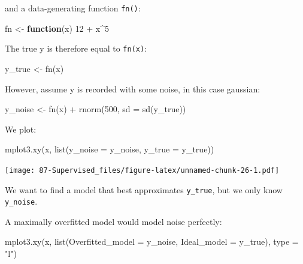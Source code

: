 \documentclass[
]{book}
\newenvironment{Shaded}{\begin{snugshade}}{\end{snugshade}}
\newcommand{\AttributeTok}[1]{\textcolor[rgb]{0.77,0.63,0.00}{#1}}
\newcommand{\ControlFlowTok}[1]{\textcolor[rgb]{0.13,0.29,0.53}{\textbf{#1}}}
\newcommand{\DecValTok}[1]{\textcolor[rgb]{0.00,0.00,0.81}{#1}}
\newcommand{\FunctionTok}[1]{\textcolor[rgb]{0.00,0.00,0.00}{#1}}
\newcommand{\NormalTok}[1]{#1}
\newcommand{\OtherTok}[1]{\textcolor[rgb]{0.56,0.35,0.01}{#1}}
\newcommand{\SpecialCharTok}[1]{\textcolor[rgb]{0.00,0.00,0.00}{#1}}
\newcommand{\StringTok}[1]{\textcolor[rgb]{0.31,0.60,0.02}{#1}}
\begin{document}
and a data-generating function \texttt{fn()}:

\begin{Shaded}
\begin{Highlighting}[]
\NormalTok{fn }\OtherTok{\textless{}{-}} \ControlFlowTok{function}\NormalTok{(x) }\DecValTok{12} \SpecialCharTok{+}\NormalTok{ x}\SpecialCharTok{\^{}}\DecValTok{5}
\end{Highlighting}
\end{Shaded}

The true y is therefore equal to \texttt{fn(x)}:

\begin{Shaded}
\begin{Highlighting}[]
\NormalTok{y\_true }\OtherTok{\textless{}{-}} \FunctionTok{fn}\NormalTok{(x)}
\end{Highlighting}
\end{Shaded}

However, assume y is recorded with some noise, in this case gaussian:

\begin{Shaded}
\begin{Highlighting}[]
\NormalTok{y\_noise }\OtherTok{\textless{}{-}} \FunctionTok{fn}\NormalTok{(x) }\SpecialCharTok{+} \FunctionTok{rnorm}\NormalTok{(}\DecValTok{500}\NormalTok{, }\AttributeTok{sd =} \FunctionTok{sd}\NormalTok{(y\_true))}
\end{Highlighting}
\end{Shaded}

We plot:

\begin{Shaded}
\begin{Highlighting}[]
\FunctionTok{mplot3.xy}\NormalTok{(x, }\FunctionTok{list}\NormalTok{(}\AttributeTok{y\_noise =}\NormalTok{ y\_noise, }\AttributeTok{y\_true =}\NormalTok{ y\_true))}
\end{Highlighting}
\end{Shaded}

\texttt{[image: 87-Supervised\_files/figure-latex/unnamed-chunk-26-1.pdf]}

We want to find a model that best approximates \texttt{y\_true}, but we only know \texttt{y\_noise}.

A maximally overfitted model would model noise perfectly:

\begin{Shaded}
\begin{Highlighting}[]
\FunctionTok{mplot3.xy}\NormalTok{(x, }\FunctionTok{list}\NormalTok{(}\AttributeTok{Overfitted\_model =}\NormalTok{ y\_noise, }\AttributeTok{Ideal\_model =}\NormalTok{ y\_true), }\AttributeTok{type =} \StringTok{"l"}\NormalTok{)}
\end{Highlighting}
\end{Shaded}
\end{document}
